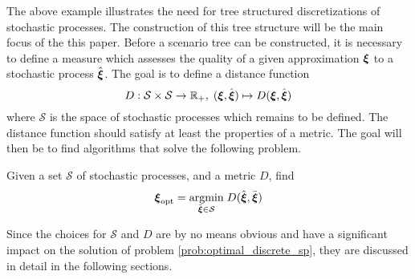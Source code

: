 The above example illustrates the need for tree structured discretizations of stochastic processes. The construction of this tree structure will be the main focus of the this paper. Before a scenario tree can be constructed, it is necessary to define a measure which assesses the quality of a given approximation $\boldsymbol\xi$ to a stochastic process $\hat{\boldsymbol\xi}$. The goal is to define a distance function
\begin{equation}
  \label{eq:distance-function-intro}
  D:\mathcal{S} \times \mathcal{S} \rightarrow \mathbb{R}_+,\;(\boldsymbol\xi, \hat{\boldsymbol\xi})\mapsto D(
\boldsymbol\xi, \hat{\boldsymbol\xi})
\end{equation}
where $\mathcal{S}$ is the space of stochastic processes which remains to be defined. The distance function should satisfy at least the properties of a metric.
The goal will then be to find algorithms that solve the following problem.
\begin{problem}
  \label{prob:optimal_discrete_sp}
  Given a set $\mathcal{S}$ of stochastic processes, and a metric $D$, find
  \begin{equation}
    \label{eq:60}
    \boldsymbol\xi_{\mathrm{opt}} = \underset{\bar{\boldsymbol\xi}\in\mathcal{S}}{\operatorname{argmin}}\; D(\hat{\boldsymbol\xi},\bar{\boldsymbol\xi})
  \end{equation}
\end{problem}
Since the choices for $\mathcal{S}$ and $D$ are by no means obvious and have a significant impact on the solution of problem \ref{prob:optimal_discrete_sp}, they are discussed in detail in the following sections.
